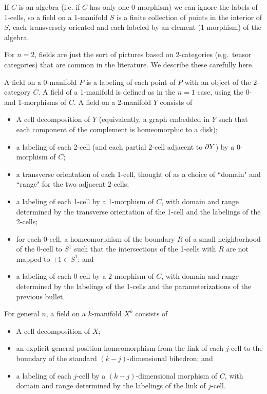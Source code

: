 \documentclass[11pt,leqno]{amsart}
\begin{document}
If $C$ is an algebra (i.e. if $C$ has only one 0-morphism) we can ignore the labels
of 1-cells, so a field on a 1-manifold $S$ is a finite collection of points in the
interior of $S$, each transversely oriented and each labeled by an element (1-morphism)
of the algebra.

\medskip

For $n=2$, fields are just the sort of pictures based on 2-categories (e.g.\ tensor categories)
that are common in the literature.
We describe these carefully here.

A field on a 0-manifold $P$ is a labeling of each point of $P$ with
an object of the 2-category $C$.
A field of a 1-manifold is defined as in the $n=1$ case, using the 0- and 1-morphisms of $C$.
A field on a 2-manifold $Y$ consists of
\begin{itemize}
    \item A cell decomposition of $Y$ (equivalently, a graph embedded in $Y$ such
that each component of the complement is homeomorphic to a disk);
    \item a labeling of each 2-cell (and each partial 2-cell adjacent to $\partial Y$)
by a 0-morphism of $C$;
    \item a transverse orientation of each 1-cell, thought of as a choice of
``domain" and ``range" for the two adjacent 2-cells;
    \item a labeling of each 1-cell by a 1-morphism of $C$, with
domain and range determined by the transverse orientation of the 1-cell
and the labelings of the 2-cells;
    \item for each 0-cell, a homeomorphism of the boundary $R$ of a small neighborhood
of the 0-cell to $S^1$ such that the intersections of the 1-cells with $R$ are not mapped
to $\pm 1 \in S^1$; and
    \item a labeling of each 0-cell by a 2-morphism of $C$, with domain and range
determined by the labelings of the 1-cells and the parameterizations of the previous
bullet.
\end{itemize}

For general $n$, a field on a $k$-manifold $X^k$ consists of
\begin{itemize}
    \item A cell decomposition of $X$;
    \item an explicit general position homeomorphism from the link of each $j$-cell
to the boundary of the standard $(k-j)$-dimensional bihedron; and
    \item a labeling of each $j$-cell by a $(k-j)$-dimensional morphism of $C$, with
domain and range determined by the labelings of the link of $j$-cell.
\end{itemize}
\end{document}
